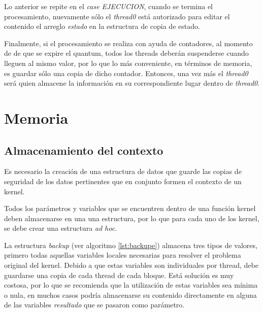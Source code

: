 Lo anterior se repite en el \textit{case EJECUCION}, cuando se termina el procesamiento, nuevamente sólo el \textit{thread0} está autorizado para editar el contenido el arreglo \textit{estado} en la estructura de copia de estado.
\newline

Finalmente, si el procesamiento se realiza con ayuda de contadores, al momento de de que se expire el quantum, todos los threads deberán suspenderse cuando lleguen al mismo valor, por lo que lo más conveniente, en términos de memoria, es guardar sólo una copia de dicho contador. Entonces, una vez más el \textit{thread0} será quien almacene la información en su correspondiente lugar dentro de \textit{thread0}.


  \section{Memoria}\label{secc:memoria}

  \subsection{Almacenamiento del contexto}

Es necesario la creación de una estructura de datos que guarde las copias de seguridad de los datos pertinentes que en conjunto formen el contexto de un kernel.
\newline










Todos los parámetros y variables que se encuentren dentro de una función kernel deben almacenarse en una una estructura, por lo que para cada uno de los kernel, se debe crear una estructura \textit{ad hoc}.
\newline

La estructura \textit{backup} (ver algoritmo \ref{lst:backupe}) almacena tres tipos de valores, primero todas aquellas variables locales necesarias para resolver el problema original del kernel. Debido a que estas variables son individuales por thread, debe guardarse una copia de cada thread de cada bloque. Está solución es muy costosa, por lo que se recomienda que la utilización de estas variables sea mínima o nula, en muchos casos podría almacenarse su contenido directamente en alguna de las variables \textit{resultado} que se pasaron como parámetro.
\newline

